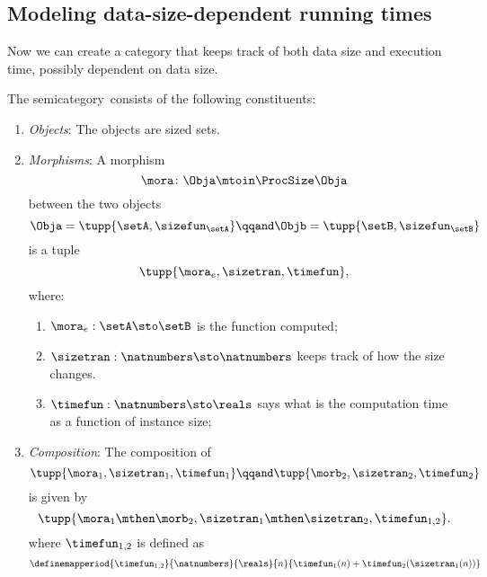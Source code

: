 \subsection{Modeling data-size-dependent running times}

Now we can create a category that keeps track of both data size and execution time, possibly dependent on data size.
\begin{definition}
    \label{def:ProcSizeTime}
    The semicategory~\ProcSizeTime consists of the following constituents:
    \begin{enumerate}
        \item \emph{Objects}: The objects are sized sets.
        \item \emph{Morphisms}: A morphism 
        \begin{equation}
            \mora \colon \Obja \mtoin\ProcSize \Obja
        \end{equation}
        between the two objects
        \begin{equation}
            \Obja = \tupp{\setA, \sizefun_{\setA}}
            \qqand 
            \Objb = \tupp{\setB, \sizefun_{\setB}}
        \end{equation}
        is a tuple 
        \begin{equation}
            \tupp{\mora_e, \sizetran, \timefun },
        \end{equation}
        where:
        \begin{enumerate}
            \item $\mora_e : \setA \sto \setB$ is the function computed;
            \item $\sizetran: \natnumbers \sto \natnumbers$ keeps track of how the size changes.
            \item $\timefun: \natnumbers \sto \reals$ says what is the computation time as a function of instance size;
        \end{enumerate}

        \item \emph{Composition}: The composition of 
        \begin{equation}
            \tupp{\mora_1, \sizetran_1,  \timefun_1  } 
            \qqand 
            \tupp{\morb_2, \sizetran_2,  \timefun_2  }
        \end{equation}
        is given by 
        \begin{equation}
            \tupp{
                \mora_1 \mthen \morb_2, 
                \sizetran_1 \mthen \sizetran_2,
                \timefun_{1,2}
            }.
        \end{equation}
        where $\timefun_{1,2}$ is defined as 
        \begin{equation}\label{eq:timefun-composition}
            \definemapperiod{
                \timefun_{1,2}
            }{
                \natnumbers 
            }{
                \reals
            }{
                n
            }{
                \timefun_1(n) + \timefun_2(\sizetran_1(n))
            }            
        \end{equation}
    \end{enumerate}
\end{definition}

